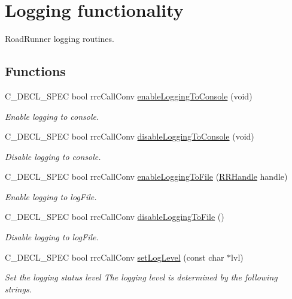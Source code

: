\hypertarget{group__logging}{}\section{Logging functionality}
\label{group__logging}


Road\+Runner logging routines.  


\subsection*{Functions}
\begin{DoxyCompactItemize}
\item 
C\+\_\+\+D\+E\+C\+L\+\_\+\+S\+P\+E\+C bool rrc\+Call\+Conv \hyperlink{group__logging_ga26aae545bbc31c1505ade0579741a4b9}{enable\+Logging\+To\+Console} (void)
\begin{DoxyCompactList}\small\item\em Enable logging to console. \end{DoxyCompactList}\item 
C\+\_\+\+D\+E\+C\+L\+\_\+\+S\+P\+E\+C bool rrc\+Call\+Conv \hyperlink{group__logging_gaa5be6edee1af88ca1f87bf17568ea1cb}{disable\+Logging\+To\+Console} (void)
\begin{DoxyCompactList}\small\item\em Disable logging to console. \end{DoxyCompactList}\item 
C\+\_\+\+D\+E\+C\+L\+\_\+\+S\+P\+E\+C bool rrc\+Call\+Conv \hyperlink{group__logging_ga4e852202d5b00e2f1482bf2c9e100799}{enable\+Logging\+To\+File} (\hyperlink{rrc__types_8h_a1d68f0592372208fa5a5f2799ea4b3ae}{R\+R\+Handle} handle)
\begin{DoxyCompactList}\small\item\em Enable logging to log\+File. \end{DoxyCompactList}\item 
C\+\_\+\+D\+E\+C\+L\+\_\+\+S\+P\+E\+C bool rrc\+Call\+Conv \hyperlink{group__logging_gaed2bf69408c13ca8e3d65149261e6689}{disable\+Logging\+To\+File} ()
\begin{DoxyCompactList}\small\item\em Disable logging to log\+File. \end{DoxyCompactList}\item 
C\+\_\+\+D\+E\+C\+L\+\_\+\+S\+P\+E\+C bool rrc\+Call\+Conv \hyperlink{group__logging_ga6e6cb15a163ea13e5ef9f0ebfded2c78}{set\+Log\+Level} (const char $\ast$lvl)
\begin{DoxyCompactList}\small\item\em Set the logging status level The logging level is determined by the following strings. \end{DoxyCompactList}\item 

\end{DoxyCompactItemize}
